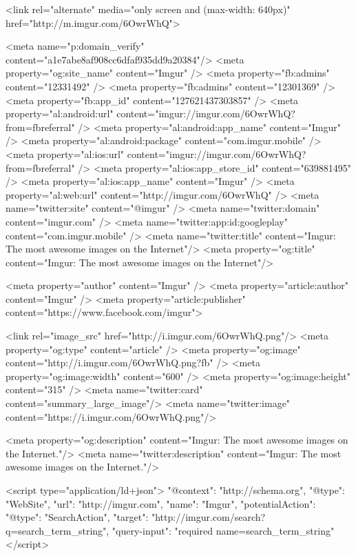                 <link rel="alternate" media="only screen and (max-width: 640px)" href="http://m.imgur.com/6OwrWhQ">
    

    <meta name="p:domain_verify" content="a1e7abe8af908cc6dfaf935dd9a20384"/>
    <meta property="og:site_name" content="Imgur" />
    <meta property="fb:admins" content="12331492" />
    <meta property="fb:admins" content="12301369" />
    <meta property="fb:app_id" content="127621437303857" />
    <meta property="al:android:url" content="imgur://imgur.com/6OwrWhQ?from=fbreferral" />
    <meta property="al:android:app_name" content="Imgur" />
    <meta property="al:android:package" content="com.imgur.mobile" />
    <meta property="al:ios:url" content="imgur://imgur.com/6OwrWhQ?from=fbreferral" />
    <meta property="al:ios:app_store_id" content="639881495" />
    <meta property="al:ios:app_name" content="Imgur" />
    <meta property="al:web:url" content="http://imgur.com/6OwrWhQ" />
    <meta name="twitter:site" content="@imgur" />
    <meta name="twitter:domain" content="imgur.com" />
    <meta name="twitter:app:id:googleplay" content="com.imgur.mobile" />
                <meta name="twitter:title" content="Imgur: The most awesome images on the Internet"/>
        <meta property="og:title" content="Imgur: The most awesome images on the Internet"/>
    

    <meta property="author" content="Imgur" />
    <meta property="article:author" content="Imgur" />
    <meta property="article:publisher" content="https://www.facebook.com/imgur">

    

                        <link rel="image_src"            href="http://i.imgur.com/6OwrWhQ.png"/>
            <meta property="og:type"         content="article" />
            <meta property="og:image"        content="http://i.imgur.com/6OwrWhQ.png?fb" />
            <meta property="og:image:width"  content="600" />
            <meta property="og:image:height" content="315" />
            <meta name="twitter:card"        content="summary_large_image"/>
            <meta name="twitter:image"       content="https://i.imgur.com/6OwrWhQ.png"/>
        
    

            <meta property="og:description" content="Imgur: The most awesome images on the Internet."/>
        <meta name="twitter:description" content="Imgur: The most awesome images on the Internet."/>
    

    
    <script type="application/ld+json">
        {
            "@context": "http://schema.org",
            "@type": "WebSite",
            "url": "http://imgur.com",
            "name": "Imgur",
            "potentialAction": {
                "@type": "SearchAction",
                "target": "http://imgur.com/search?q={search_term_string}",
                "query-input": "required name=search_term_string"
            }
        }
    </script>
    
